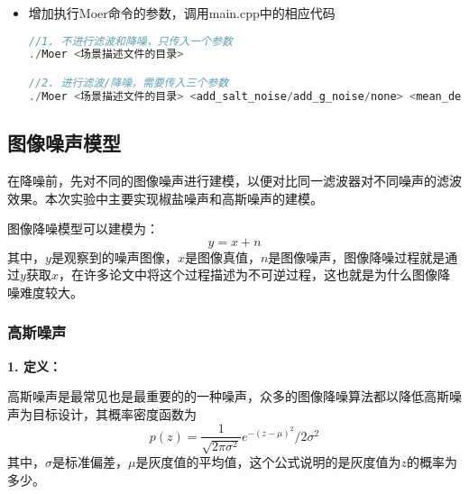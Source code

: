 \documentclass[lang=cn,10pt]{elegantbook}
\begin{document}
\begin{itemize}
\begin{lstlisting}[language=c++]
    //输出降噪后的图片
    if (std::regex_match(outputName2, std::regex("(.*)(\\.png)"))) {
      camera->film->save_dePNG(outputName2.c_str());
    } else if (std::regex_match(outputName2, std::regex("(.*)(\\.hdr)"))) {
      camera->film->save_deHDR(outputName2.c_str());
    } else {
      std::cout << "Only support output as PNG/HDR\n";
    }

    std::cout<< "Save denoised image to "<<outputName2<<std::endl;
    // 计算去噪用时
    printf("\nIntel Denoising costs %.2fs\n",(std::chrono::duration_cast<std::chrono::milliseconds>(e - s)) .count() / 1000.f);   
  }
\end{lstlisting}

\item 增加执行Moer命令的参数，调用main.cpp中的相应代码
\begin{lstlisting}[language=c++]
//1. 不进行滤波和降噪，只传入一个参数
./Moer <场景描述文件的目录>

//2. 进行滤波/降噪，需要传入三个参数
./Moer <场景描述文件的目录> <add_salt_noise/add_g_noise/none> <mean_denoise/median_denoise/g_denoise/bi_denoise/none>
\end{lstlisting}

\end{itemize}
\subsection{图像噪声模型}
在降噪前，先对不同的图像噪声进行建模，以便对比同一滤波器对不同噪声的滤波效果。本次实验中主要实现椒盐噪声和高斯噪声的建模。

图像降噪模型可以建模为：
\begin{equation}\label{eu_eqn}
y=x+n
\end{equation}
其中，$y$是观察到的噪声图像，$x$是图像真值，$n$是图像噪声，图像降噪过程就是通过$y$获取$x$，在许多论文中将这个过程描述为不可逆过程\cite{gu2019review}，这也就是为什么图像降噪难度较大。

\subsubsection{高斯噪声}\label{sec:g_noise}%
\textcolor{third}{\textbf{1. 定义：}}

高斯噪声是最常见也是最重要的的一种噪声，众多的图像降噪算法都以降低高斯噪声为目标设计，其概率密度函数为
\begin{equation}\label{eu_eqn}
p(z)=\frac{1}{\sqrt{2\pi\sigma^2}}e^{-(z-\mu)^2}/2\sigma^2
\end{equation}
其中，$\sigma$是标准偏差，$\mu$是灰度值的平均值，这个公式说明的是灰度值为$z$的概率为多少。
\end{document}
